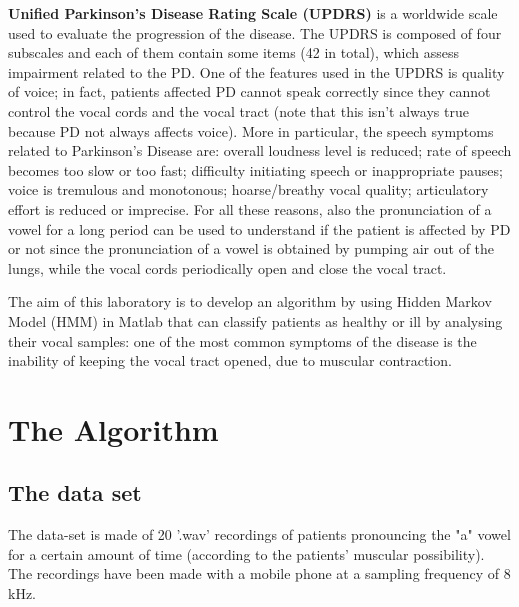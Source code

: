 \documentclass[a4paper,12pt,oneside,titlepage]{article}
\begin{document}
	\textbf{Unified Parkinson’s Disease Rating Scale (UPDRS)} is a worldwide scale used to evaluate the progression of the disease. The UPDRS is composed of four subscales and each of them contain some items (42 in total), which assess impairment related to the PD. One of the features used in the UPDRS is quality of voice; in fact, patients affected PD cannot speak correctly since they cannot control the vocal cords and the vocal tract (note that this isn’t always true because PD not always affects voice). More in particular, the speech symptoms related to Parkinson’s Disease are: overall loudness level is reduced; rate of speech becomes too slow or too fast; difficulty initiating speech or inappropriate pauses; voice is tremulous and monotonous; hoarse/breathy vocal quality; articulatory effort is reduced or imprecise. For all these reasons, also the pronunciation of a vowel for a long period can be used to understand if the patient is affected by PD or not since the pronunciation of a vowel is obtained by pumping air out of the lungs, while the vocal cords periodically open and close the vocal tract.
	
	
	The aim of this laboratory is to develop an algorithm by using Hidden Markov Model (HMM) in Matlab that can classify patients as healthy or ill by analysing their vocal samples: one of the most common symptoms of the disease is the inability of keeping the vocal tract opened, due to muscular contraction.
	
	
	
	\section{The Algorithm}
		
	\subsection{The data set}
	The data-set is made of 20 '.wav' recordings of patients pronouncing the "a" vowel for a certain amount of time (according to the patients’ muscular possibility). The recordings have been made with a mobile phone at a sampling frequency of 8 kHz.
	
\end{document}
